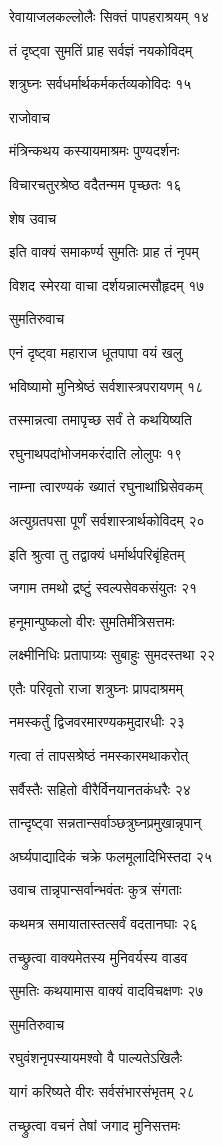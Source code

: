 रेवायाजलकल्लोलैः सिक्तं पापहराश्रयम् १४

तं दृष्ट्वा सुमतिं प्राह सर्वज्ञं नयकोविदम्

शत्रुघ्नः सर्वधर्मार्थकर्मकर्तव्यकोविदः १५

राजोवाच

मंत्रिन्कथय कस्यायमाश्रमः पुण्यदर्शनः

विचारचतुरश्रेष्ठ वदैतन्मम पृच्छतः १६

शेष उवाच

इति वाक्यं समाकर्ण्य सुमतिः प्राह तं नृपम्

विशद स्मेरया वाचा दर्शयन्नात्मसौहृदम् १७

सुमतिरुवाच

एनं दृष्ट्वा महाराज धूतपापा वयं खलु

भविष्यामो मुनिश्रेष्ठं सर्वशास्त्रपरायणम् १८

तस्मान्नत्वा तमापृच्छ सर्वं ते कथयिष्यति

रघुनाथपदांभोजमकरंदाति लोलुपः १९

नाम्ना त्वारण्यकं ख्यातं रघुनाथांघ्रिसेवकम्

अत्युग्रतपसा पूर्णं सर्वशास्त्रार्थकोविदम् २०

इति श्रुत्वा तु तद्वाक्यं धर्मार्थपरिबृंहितम्

जगाम तमथो द्रष्टुं स्वल्पसेवकसंयुतः २१

हनूमान्पुष्कलो वीरः सुमतिर्मंत्रिसत्तमः

लक्ष्मीनिधिः प्रतापाग्र्यः सुबाहुः सुमदस्तथा २२

एतैः परिवृतो राजा शत्रुघ्नः प्रापदाश्रमम्

नमस्कर्तुं द्विजवरमारण्यकमुदारधीः २३

गत्वा तं तापसश्रेष्ठं नमस्कारमथाकरोत्

सर्वैस्तैः सहितो वीरैर्विनयानतकंधरैः २४

तान्दृष्ट्वा सन्नतान्सर्वाञ्छत्रुघ्नप्रमुखान्नृपान्

अर्घ्यपाद्यादिकं चक्रे फलमूलादिभिस्तदा २५

उवाच तान्नृपान्सर्वान्भवंतः कुत्र संगताः

कथमत्र समायातास्तत्सर्वं वदतानघाः २६

तच्छ्रुत्वा वाक्यमेतस्य मुनिवर्यस्य वाडव

सुमतिः कथयामास वाक्यं वादविचक्षणः २७

सुमतिरुवाच

रघुवंशनृपस्यायमश्वो वै पाल्यतेऽखिलैः

यागं करिष्यते वीरः सर्वसंभारसंभृतम् २८

तच्छ्रुत्वा वचनं तेषां जगाद मुनिसत्तमः

